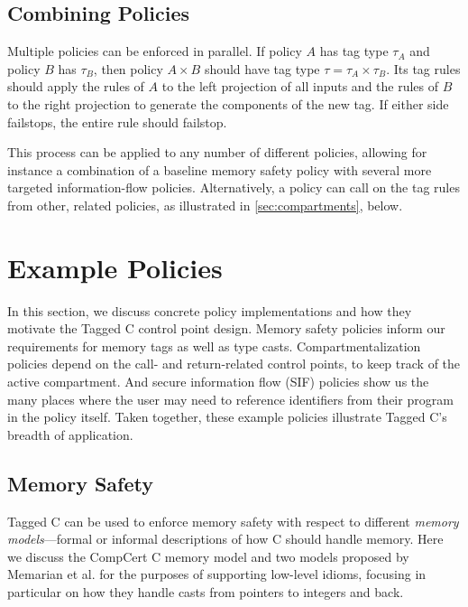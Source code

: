 \documentclass{llncs}
\begin{document}
\subsection{Combining Policies}

Multiple policies can be enforced in parallel. If policy \(A\) has tag type \(\tau_A\)
and policy \(B\) has \(\tau_B\), then policy \(A \times B\) should have tag type
\(\tau = \tau_A \times \tau_B\). Its tag rules should apply the rules of \(A\) to
the left projection of all inputs and the rules of \(B\) to the right projection
to generate the components of the new tag. If either side failstops, the entire
rule should failstop.

This process can be applied to any number of different policies, allowing for instance
a combination of a baseline memory safety policy with several more targeted
information-flow policies. Alternatively, a policy can call on the tag rules
from other, related policies, as illustrated in \cref{sec:compartments}, below.

\section{Example Policies}
\label{sec:policies}

In this section, we discuss concrete policy implementations and how 
they motivate the Tagged C control point design. Memory safety policies
inform our requirements for memory tags as well as type casts. Compartmentalization
policies depend on the call- and return-related control points, to keep track of the
active compartment. And secure information flow (SIF) policies show us the many places
where the user may need to reference identifiers from their program in the policy itself.
Taken together, these example policies illustrate Tagged C's breadth of application.

\subsection{Memory Safety}
\label{sec:memsafe}

Tagged C can be used to enforce memory safety with respect to different {\em memory models}---formal
or informal descriptions of how C should handle memory. Here we discuss the CompCert C
memory model and two models proposed by Memarian et al. \cite{Memarian19:ExploringCSemantics}
for the purposes of supporting low-level idioms, focusing in particular on how they handle
casts from pointers to integers and back.
\end{document}
